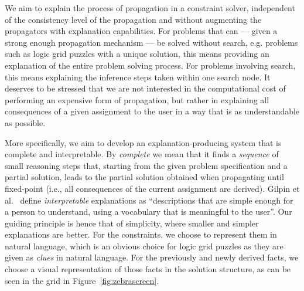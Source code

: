 We aim to explain the process of propagation in a constraint solver, independent of the consistency level of the propagation and without augmenting the propagators with explanation capabilities.
For problems that can --- given a strong enough propagation mechanism --- be solved without search, e.g. problems such as logic grid puzzles with a unique solution, this means providing an explanation of the entire problem solving process. For problems involving search, this means explaining the inference steps taken within one search node. 
It deserves to be stressed that we are not interested in the computational cost of performing an expensive form of propagation, but rather in explaining all consequences of a given assignment to the user in a way that is as understandable as possible. 

More specifically, we aim to develop an explanation-producing system that is complete and interpretable. By \textit{complete} we mean that it finds a \textit{sequence} of small reasoning steps that, starting from the given problem specification and a partial solution, leads to the partial solution obtained when propagating until fixed-point (i.e., all consequences of the current assignment are derived). %
%
Gilpin et al.~\cite{DBLP:conf/dsaa/GilpinBYBSK18} define \textit{interpretable} explanations as ``descriptions that are simple enough for a person to understand, using a vocabulary that is meaningful to the user''. Our guiding principle is hence that of simplicity, where smaller and simpler explanations are better. %
For the constraints, we choose to represent them in natural language, which is an obvious choice for logic grid puzzles as they are given as \textit{clues} in natural language. For the previously and newly derived facts, we choose a visual representation of those facts in the solution structure, as can be seen in the grid in Figure~\ref{fig:zebrascreen}.


